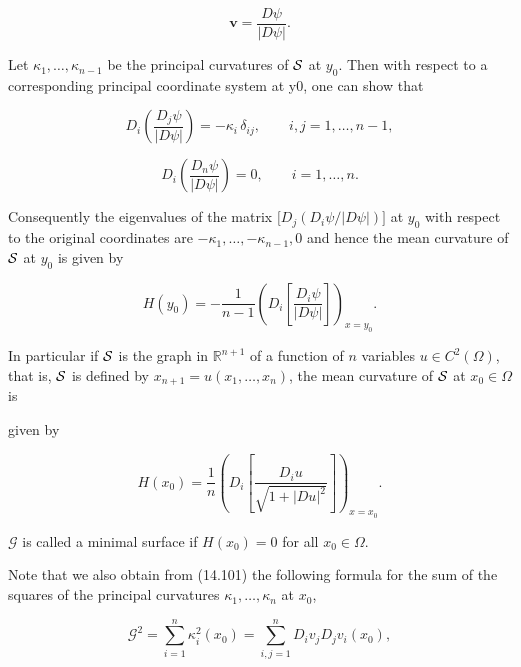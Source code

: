 \begin{equation}
\tag{14.100}
\mathbf{v}=\frac{D\psi}{|D\psi|}.
\end{equation}

\noindent Let $\kappa_1,\ldots,\kappa_{n-1}$ be the principal curvatures of $\mathcal{S}$ at $y_0$. Then with respect to a
corresponding principal coordinate system at y0, one can show that

\begin{equation}
\tag{14.101}
D_i\!\left(\frac{D_j\psi}{|D\psi|}\right)=-\kappa_i\,\delta_{ij}, \qquad i,j=1,\ldots,n-1,
\end{equation}

\[
D_i\!\left(\frac{D_n\psi}{|D\psi|}\right)=0,\qquad i=1,\ldots,n.
\]

Consequently the eigenvalues of the matrix $\bigl[D_j(D_i\psi/|D\psi|)\bigr]$ at $y_0$ with respect to
the original coordinates are $-\kappa_1,\ldots,-\kappa_{n-1},0$ and hence the mean curvature
of $\mathcal{S}$ at $y_0$ is given by

\begin{equation}
\tag{14.102}
H(y_0)=-\frac{1}{n-1}\left(D_i\left[\frac{D_i\psi}{|D\psi|}\right]\right)_{x=y_0}.
\end{equation}

In particular if $\mathcal{S}$ is the graph in $\mathbb{R}^{n+1}$ of a function of $n$ variables $u\in C^2(\Omega)$, that
is, $\mathcal{S}$ is defined by $x_{n+1}=u(x_1,\ldots,x_n)$, the mean curvature of $\mathcal{S}$ at $x_0\in\Omega$ is



\pagestyle{empty}


given by

\begin{equation}
\tag{14.103}
H(x_0)=\frac{1}{n}\left(D_i\left[\frac{D_i u}{\sqrt{1+|Du|^2}}\right]\right)_{x=x_0}.
\end{equation}

\noindent$\mathcal{G}$ is called a minimal surface if $H(x_0)=0$ for all $x_0\in\Omega$.

\noindent Note that we also obtain from (14.101) the following formula for the sum of the
squares of the principal curvatures $\kappa_1,\ldots,\kappa_n$ at $x_0$,

\begin{equation}
\tag{14.104}
\mathcal{G}^2=\sum_{i=1}^n \kappa_i^2(x_0)=\sum_{i,j=1}^n D_i v_j D_j v_i(x_0),
\end{equation}


